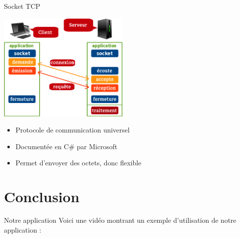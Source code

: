 \documentclass[a4paper,10pt]{beamer}
\begin{document}
	
	\begin{frame}{Socket TCP}
		\centerline{\includegraphics[height=150pt]{images/network/tcp-socket6.png}}
			\begin{itemize}
				\item \pause Protocole de communication universel \pause
				\item Documentée en C\# par Microsoft \pause
				\item Permet d'envoyer des octets, donc flexible
			\end{itemize}
	\end{frame}
	
	\section{Conclusion}
	
	\begin{frame}{Notre application}
		Voici une vidéo montrant un exemple d'utilisation de notre application :
	\end{frame}
	
\end{document}
